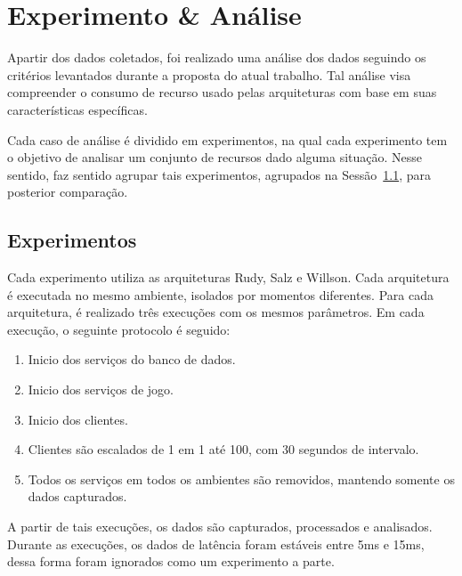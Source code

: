 \chapter{Experimento \& Análise}
\label{cap6}

Apartir dos dados coletados, foi realizado uma análise dos dados seguindo os critérios levantados durante a proposta do atual trabalho.
%
Tal análise visa compreender o consumo de recurso usado pelas arquiteturas com base em suas características específicas.

Cada caso de análise é dividido em experimentos, na qual cada experimento tem o objetivo de analisar um conjunto de recursos dado alguma situação.
%
Nesse sentido, faz sentido agrupar tais experimentos, agrupados na Sessão~\ref{sec:experimentos}, para posterior comparação.




\section{Experimentos}
\label{sec:experimentos}

Cada experimento utiliza as arquiteturas Rudy, Salz e Willson.
%
Cada arquitetura é executada no mesmo ambiente, isolados por momentos diferentes.
%
Para cada arquitetura, é realizado três execuções com os mesmos parâmetros.
%
Em cada execução, o seguinte protocolo é seguido:

\begin{enumerate}
 \item Inicio dos serviços do banco de dados.
 \item Inicio dos serviços de jogo.
 \item Inicio dos clientes.
 \item Clientes são escalados de 1 em 1 até 100, com 30 segundos de intervalo.
 \item Todos os serviços em todos os ambientes são removidos, mantendo somente os dados capturados.
\end{enumerate}

A partir de tais execuções, os dados são capturados, processados e analisados.
%
Durante as execuções, os dados de latência foram estáveis entre 5ms e 15ms, dessa forma foram ignorados como um experimento a parte.

